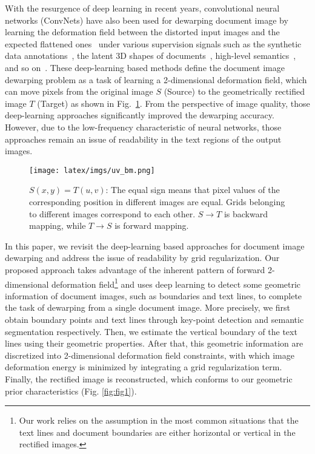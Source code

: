 \documentclass[10pt,twocolumn,letterpaper]{article}
\begin{document}
With the resurgence of deep learning in recent years, convolutional neural networks (ConvNets) have also been used for dewarping document image by learning the deformation field between the distorted input images and the expected flattened ones~\cite{Ma_2018_CVPR,Das_2019_ICCV,li2019document,CEARSE,xie2020dewarping,das2021end} under various supervision signals such as the synthetic data annotations~\cite{Ma_2018_CVPR}, the latent 3D shapes of documents~\cite{Das_2019_ICCV}, high-level semantics~\cite{CEARSE}, and so on~\cite{xie2020dewarping,das2021end}. 
These deep-learning based methods define the document image dewarping problem as a task of learning a 2-dimensional deformation field, which can move pixels from the original image $S$ (Source) to the geometrically rectified image $T$ (Target) as shown in Fig.~\ref{fig:DS}.
From the perspective of image quality, those deep-learning approaches significantly improved the dewarping accuracy. However, due to the low-frequency characteristic of neural networks, those approaches remain an issue of readability in the text regions of the output images. 


\begin{figure}[!t]
  \centering
\texttt{[image: latex/imgs/uv\_bm.png]}

   \caption{$S(x,y) = T(u,v)$: The equal sign means that pixel values of the corresponding position in different images are equal. Grids belonging to different images correspond to each other. $S \rightarrow T$ is backward mapping, while $T \rightarrow S$ is forward mapping.}
   \label{fig:DS}
   \vspace{1em}
\end{figure}



In this paper, we revisit the deep-learning based approaches for document image dewarping and address the issue of readability by grid regularization.
Our proposed approach takes advantage of the inherent pattern of forward 2-dimensional deformation field\footnote{Our work relies on the assumption in the most common situations that the text lines and document boundaries are either horizontal or vertical in the rectified images.} and uses deep learning to detect some geometric information of document images, such as boundaries and text lines, to complete the task of dewarping from a single document image. 
More precisely, we first obtain boundary points and text lines through key-point detection and semantic segmentation respectively. Then, we estimate the vertical boundary of the text lines using their geometric properties. After that, this geometric information are discretized into 2-dimensional deformation field constraints, with which image deformation energy is minimized by integrating a grid regularization term. Finally, the rectified image is reconstructed, which conforms to our geometric prior characteristics (Fig. \ref{fig:fig1}). 
\end{document}
